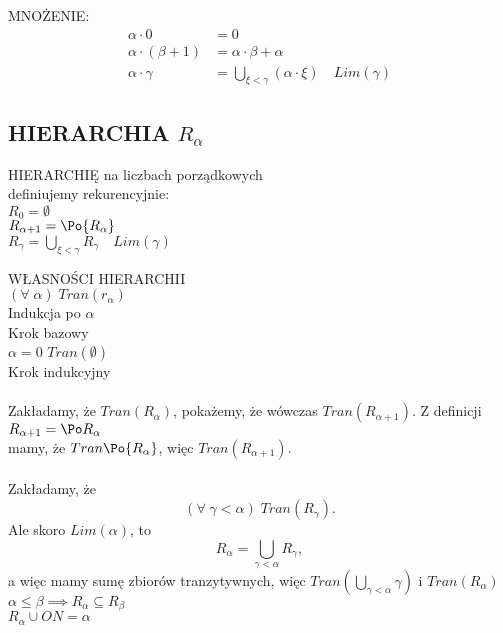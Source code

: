 {\large\color{def}MNOŻENIE}:
\begin{align*}
    \alpha\cdot 0 &= 0\\
    \alpha\cdot(\beta+1)&=\alpha\cdot\beta+\alpha\\
    \alpha\cdot\gamma&=\bigcup\limits_{\xi<\gamma}(\alpha\cdot\xi)\quad Lim(\gamma)
\end{align*}

\subsection{HIERARCHIA $R_\alpha$}
\begin{center}\large
    {\color{def}HIERARCHIĘ} na liczbach porządkowych \\definiujemy rekurencyjnie:\smallskip\\
    $R_0=\emptyset$\smallskip\\
    $R_{\alpha+1}=\Po{R_\alpha}$\smallskip\\
    $R_\gamma=\bigcup\limits_{\xi<\gamma}R_\gamma\quad Lim(\gamma)$
\end{center}
{\large\color{acc}WŁASNOŚCI HIERARCHII}\medskip\\
 $(\forall\;\alpha)\;Tran(r_\alpha)$\smallskip\\
Indukcja po $\alpha$\smallskip\\
Krok bazowy\smallskip\\
$\alpha= 0$ $Tran(\emptyset)$\medskip\\
\indent Krok indukcyjny\smallskip\\
\smallskip\\
Zakładamy, że $Tran(R_\alpha)$, pokażemy, że wówczas $Tran(R_{\alpha+1})$. Z definicji $R_{\alpha+1}=\Po R_\alpha$ \\mamy, że $Tran\Po{R_\alpha}$, więc $Tran(R_{\alpha+1})$. \medskip\\
\smallskip\\
Zakładamy, że 
$$(\forall\;\gamma<\alpha)\;Tran(R_\gamma).$$
Ale skoro $Lim(\alpha)$, to
$$R_\alpha=\bigcup\limits_{\gamma<\alpha}R_\gamma,$$
a więc mamy sumę zbiorów tranzytywnych, więc $Tran(\bigcup\limits_{\gamma<\alpha}\gamma)$ i $Tran(R_\alpha)$\bigskip\\
 $\alpha\leq \beta\implies R_\alpha\subseteq R_\beta$\bigskip\\
 $R_\alpha\cup ON=\alpha$\bigskip\\


